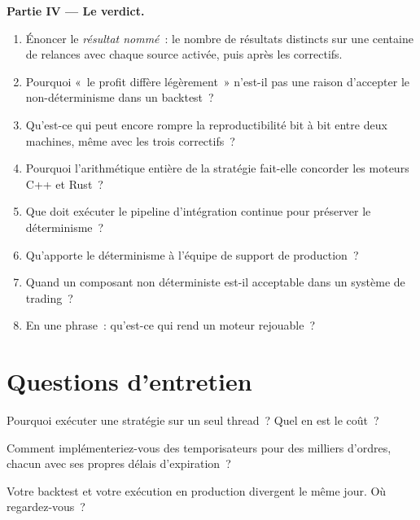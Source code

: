 \begin{problem}
\medskip\noindent\textbf{Partie IV --- Le verdict.}
\begin{enumerate}[resume]
\item Énoncer le \emph{résultat nommé}~: le nombre de résultats distincts sur une centaine de relances avec chaque source activée, puis après
les correctifs.
\item Pourquoi «~le profit diffère légèrement~» n'est-il pas une raison d'accepter le non-déterminisme dans un backtest~?
\item Qu'est-ce qui peut encore rompre la reproductibilité bit à bit entre deux machines, même avec les trois correctifs~?
\item Pourquoi l'arithmétique entière de la stratégie fait-elle concorder les moteurs C++ et Rust~?
\item Que doit exécuter le pipeline d'intégration continue pour préserver le déterminisme~?
\item Qu'apporte le déterminisme à l'équipe de support de production~?
\item Quand un composant non déterministe est-il acceptable dans un système de trading~?
\item En une phrase~: qu'est-ce qui rend un moteur rejouable~?
\end{enumerate}
\end{problem}

\section{Questions d'entretien}

\begin{interviewq}\label{iq:ll:the-strategy-engine:1}
Pourquoi exécuter une stratégie sur un seul thread~? Quel en est le coût~?
\end{interviewq}

\begin{interviewq}\label{iq:ll:the-strategy-engine:2}
Comment implémenteriez-vous des temporisateurs pour des milliers d'ordres, chacun avec ses propres délais d'expiration~?
\end{interviewq}

\begin{interviewq}\label{iq:ll:the-strategy-engine:3}
Votre backtest et votre exécution en production divergent le même jour. Où regardez-vous~?
\end{interviewq}

